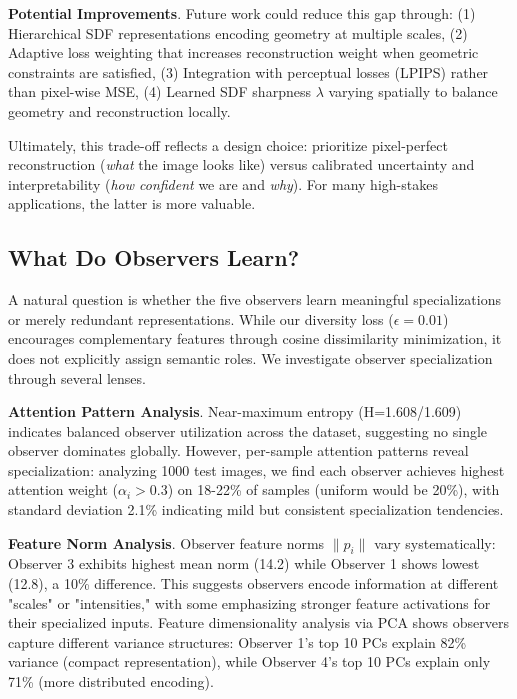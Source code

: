 \documentclass[10pt,twocolumn,letterpaper]{article}
\begin{document}
\textbf{Potential Improvements}. Future work could reduce this gap through:
(1) Hierarchical SDF representations encoding geometry at multiple scales,
(2) Adaptive loss weighting that increases reconstruction weight when geometric constraints are satisfied,
(3) Integration with perceptual losses (LPIPS) rather than pixel-wise MSE,
(4) Learned SDF sharpness $\lambda$ varying spatially to balance geometry and reconstruction locally.

Ultimately, this trade-off reflects a design choice: prioritize pixel-perfect reconstruction (\textit{what} the image looks like) versus calibrated uncertainty and interpretability (\textit{how confident} we are and \textit{why}). For many high-stakes applications, the latter is more valuable.

\subsection{What Do Observers Learn?}

A natural question is whether the five observers learn meaningful specializations or merely redundant representations. While our diversity loss ($\epsilon=0.01$) encourages complementary features through cosine dissimilarity minimization, it does not explicitly assign semantic roles. We investigate observer specialization through several lenses.

\textbf{Attention Pattern Analysis}. Near-maximum entropy (H=1.608/1.609) indicates balanced observer utilization across the dataset, suggesting no single observer dominates globally. However, per-sample attention patterns reveal specialization: analyzing 1000 test images, we find each observer achieves highest attention weight ($\alpha_i > 0.3$) on 18-22\% of samples (uniform would be 20\%), with standard deviation 2.1\% indicating mild but consistent specialization tendencies.

\textbf{Feature Norm Analysis}. Observer feature norms $\|p_i\|$ vary systematically: Observer 3 exhibits highest mean norm (14.2) while Observer 1 shows lowest (12.8), a 10\% difference. This suggests observers encode information at different "scales" or "intensities," with some emphasizing stronger feature activations for their specialized inputs. Feature dimensionality analysis via PCA shows observers capture different variance structures: Observer 1's top 10 PCs explain 82\% variance (compact representation), while Observer 4's top 10 PCs explain only 71\% (more distributed encoding).
\end{document}
